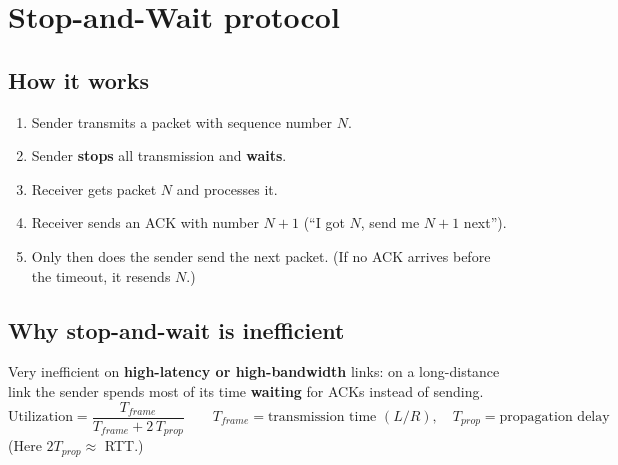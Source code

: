 \section{Stop-and-Wait protocol}
\subsection{How it works}
\begin{enumerate}
  \item Sender transmits a packet with sequence number $N$.
  \item Sender \textbf{stops} all transmission and \textbf{waits}.
  \item Receiver gets packet $N$ and processes it.
  \item Receiver sends an ACK with number $N+1$ (``I got $N$, send me $N+1$ next'').
  \item Only then does the sender send the next packet. (If no ACK arrives before the timeout, it resends $N$.)
\end{enumerate}

\begin{center}
\end{center}

\subsection{Why stop-and-wait is inefficient}
Very inefficient on \textbf{high-latency or high-bandwidth} links: on a long-distance link the sender spends most of its time \textbf{waiting} for ACKs instead of sending.
\[
\text{Utilization} = \frac{T_{frame}}{T_{frame} + 2\,T_{prop}}
\qquad T_{frame} = \text{transmission time } (L/R), \quad T_{prop} = \text{propagation delay}
\]
(Here $2T_{prop} \approx$ RTT.)

